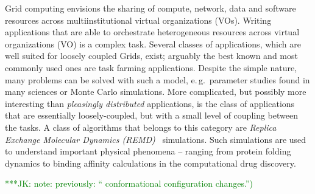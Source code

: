 \documentclass[times, 10pt,twocolumn]{article}
\newcommand{\kimnote}[1]{ {\textcolor{green} { ***JK: #1 }}}
\newcommand{\jhanote}[1]{ {\textcolor{red} { ***SJ: #1 }}}
\begin{document}
                           
Grid computing envisions the sharing of compute, network, data and
software resources across multiinstitutional virtual organizations
(VOs). Writing applications that are able to orchestrate heterogeneous
resources across virtual organizations (VO) is a complex task.  Several 
classes of applications, which are well suited for loosely
coupled Grids, exist; arguably the best known and most commonly used ones are
task farming applications. Despite the simple nature, many problems
can be solved with such a model, e.\,g.\ parameter studies found in
many sciences or Monte Carlo simulations. More
complicated, but possibly more interesting than {\it pleasingly
  distributed} applications, is the class of applications that are
essentially loosely-coupled, but with a small level of coupling
between the tasks.   A class of algorithms that belongs to this category are
\emph{Replica Exchange Molecular Dynamics (REMD)}~\cite{hansmann,Sugita:1999rm} simulations.
Such simulations are used to understand important physical phenomena
-- ranging from protein folding dynamics to binding affinity
  calculations in the computational drug discovery. 
  
\kimnote{note:
  previously: `` conformational configuration changes.'')}

              
\end{document}
